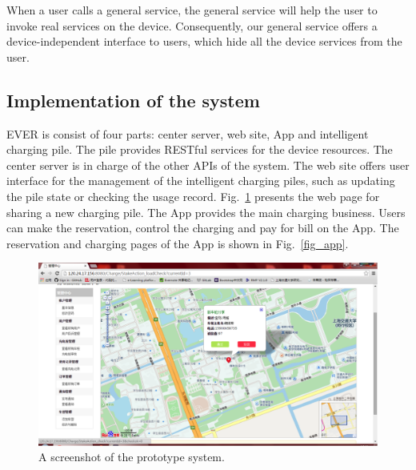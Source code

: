 When a user calls a general service, the general service will help the user to invoke real services on the device. Consequently, our general service offers a device-independent interface to users, which hide all the device services from the user. 

\subsection{Implementation of the system}
EVER is consist of four parts: center server, web site, App and intelligent charging pile. The pile provides RESTful services for the device resources. The center server is in charge of the other APIs of the system. The web site offers user interface for the management of the intelligent charging piles, such as updating the pile state or checking the usage record. Fig.~\ref{fig_prototype1} presents the web page for sharing a new charging pile. The App provides the main charging business. Users can make the reservation, control the charging and pay for bill on the App. The reservation and charging pages of the App is shown in Fig.~\ref{fig_app}. 

\begin{figure}[!t]
\centering
\includegraphics[width=1.0\linewidth]{./graph/prototype1}
\caption{A screenshot of the prototype system.}
\label{fig_prototype1}
\end{figure}

